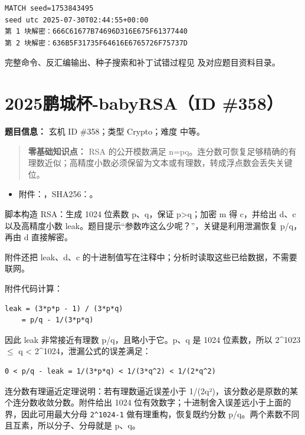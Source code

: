 \begin{verbatim}
MATCH seed=1753843495
seed utc 2025-07-30T02:44:55+00:00
第 1 块解密：666C61677B74696D316E675F61377440
第 2 块解密：636B5F31735F64616E6765726F75737D
\end{verbatim}

完整命令、反汇编输出、种子搜索和补丁试错过程见 \texttt{} 及对应题目资料目录。

\section{2025鹏城杯-babyRSA（ID \#358）}\label{ux9e4fux57ceux676f-babyrsaid-358}

\textbf{题目信息：} 玄机 ID \#358；类型 Crypto；难度 中等。

\begin{quote}
\textbf{零基础知识点：} RSA 的公开模数满足 n=pq。连分数可恢复足够精确的有理数近似；高精度小数必须保留为文本或有理数，转成浮点数会丢失关键位。
\end{quote}

\begin{itemize}
\tightlist
\item
  附件：\texttt{}，SHA256：\texttt{}。
\end{itemize}

脚本构造 RSA：生成 1024 位素数 p、q，保证 p\textgreater q；加密 m 得 c，并给出 d、c 以及高精度小数 leak。题目提示``参数咋这么少呢？''，关键是利用泄漏恢复 p/q，再由 d 直接解密。

附件还把 leak、d、c 的十进制值写在注释中；分析时读取这些已给数据，不需要联网。

附件代码计算：

\begin{verbatim}
leak = (3*p*p - 1) / (3*p*q)
    = p/q - 1/(3*p*q)
\end{verbatim}

因此 leak 非常接近有理数 p/q，且略小于它。p、q 是 1024 位素数，所以 2\^{}1023 $\le$ q \textless{} 2\^{}1024，泄漏公式的误差满足：

\begin{verbatim}
0 < p/q - leak = 1/(3*p*q) < 1/(3*q^2) < 1/(2*q^2)
\end{verbatim}

连分数有理逼近定理说明：若有理数逼近误差小于 1/(2q²)，该分数必是原数的某个连分数收敛分数。附件给出 1024 位有效数字；十进制舍入误差远小于上面的界，因此可用最大分母 \texttt{2\^{}1024-1} 做有理重构，恢复既约分数 p/q。两个素数不同且互素，所以分子、分母就是 p、q。

